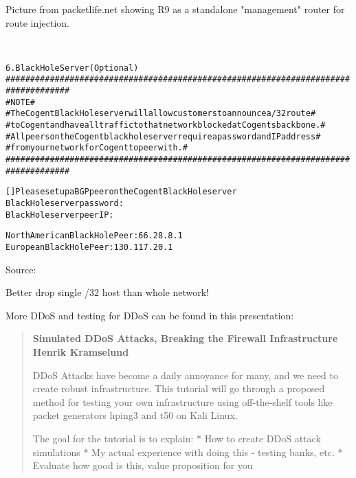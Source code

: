 \documentclass[Screen16to9,17pt]{foils}
\begin{document}

Picture from packetlife.net showing  R9 as a standalone "management" router for route injection.

{\footnotesize
{}\\
}



\begin{alltt}\footnotesize
6.  Black Hole Server (Optional)
   ###################################################################################
   #                           NOTE                                                  #
   #  The Cogent Black Hole server will allow customers to announce a /32 route      #
   #  to Cogent and have all traffic to that network blocked at Cogents backbone.    #
   #  All peers on the Cogent black hole server require a password and IP address    #
   #  from your network for Cogent to peer with.                                     #
   ###################################################################################

       [   ]  Please set up a BGP peer on the Cogent Black Hole server
       Black Hole server password:
       Black Hole server peer IP:

       North American Black Hole Peer:  66.28.8.1
       European Black Hole Peer:  130.117.20.1
\end{alltt}

Source:\\
{\footnotesize{}}

\centerline{Better drop single /32 host than whole network!}


More DDoS and testing for DDoS can be found in this presentation:
\begin{quote}\footnotesize{\bf
Simulated DDoS Attacks, Breaking the Firewall Infrastructure
Henrik Kramselund}

DDoS Attacks have become a daily annoyance for many, and we need to create robust infrastructure. This tutorial will go through a proposed method for testing your own infrastructure using off-the-shelf tools like packet generators hping3 and t50 on Kali Linux.

The goal for the tutorial is to explain:
* How to create DDoS attack simulations
* My actual experience with doing this - testing banks, etc.
* Evaluate how good is this, value proposition for you
\end{quote}
\end{document}
